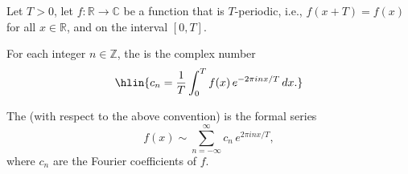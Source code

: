 \begin{definition}
\label{definition:fourier_coefficient_of_a_periodic_function_on_R}
Let $T > 0$, let $f : \mathbb{R} \to \mathbb{C}$ be a function that is $T$-periodic, i.e., $f(x + T) = f(x)$ for all $x \in \mathbb{R}$, and  on the interval $[0,T]$.

For each integer $n \in \mathbb{Z}$, the  is the complex number
$$\hlin{c_n = \frac{1}{T} \int_0^T f(x) \, e^{-2\pi i n x / T} \, dx.}$$

The  (with respect to the above convention) is the formal series
$$f(x) \sim \sum_{n=-\infty}^{\infty} c_n \, e^{2\pi i n x / T},$$
where $c_n$ are the Fourier coefficients of $f$.
\end{definition}